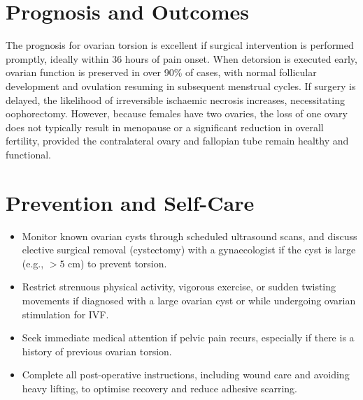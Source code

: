 \section*{Prognosis and Outcomes}
The prognosis for ovarian torsion is excellent if surgical intervention is performed promptly, ideally within 36 hours of pain onset. When detorsion is executed early, ovarian function is preserved in over 90\% of cases, with normal follicular development and ovulation resuming in subsequent menstrual cycles. If surgery is delayed, the likelihood of irreversible ischaemic necrosis increases, necessitating oophorectomy. However, because females have two ovaries, the loss of one ovary does not typically result in menopause or a significant reduction in overall fertility, provided the contralateral ovary and fallopian tube remain healthy and functional.

\section*{Prevention and Self-Care}
\begin{itemize}
    \item Monitor known ovarian cysts through scheduled ultrasound scans, and discuss elective surgical removal (cystectomy) with a gynaecologist if the cyst is large (e.g., $>5$ cm) to prevent torsion.
    \item Restrict strenuous physical activity, vigorous exercise, or sudden twisting movements if diagnosed with a large ovarian cyst or while undergoing ovarian stimulation for IVF.
    \item Seek immediate medical attention if pelvic pain recurs, especially if there is a history of previous ovarian torsion.
    \item Complete all post-operative instructions, including wound care and avoiding heavy lifting, to optimise recovery and reduce adhesive scarring.
\end{itemize}

